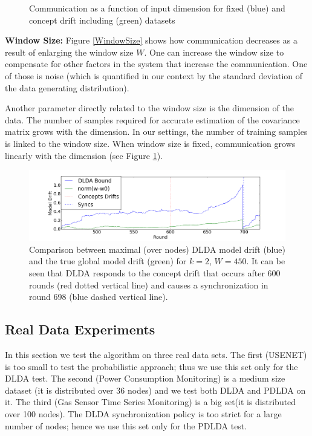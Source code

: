 \begin{figure}[!htb]
  \caption{Communication as a function of input dimension for fixed (blue) and concept drift including (green) datasets}\label{Dimension}
\endminipage
\end{figure}

\noindent\textbf{Window Size:}
Figure \ref{WindowSize} shows how communication decreases as a result
of enlarging the window size $W$.  One can increase the window size to compensate for other factors in the system that increase the communication. One of those is
noise (which is quantified in our context by the standard deviation of the
data generating distribution).


Another parameter directly related to the window size is the dimension of the data. The number of samples required for accurate estimation of the covariance matrix grows with the dimension. In our settings, the number of training samples is linked to the window size. When window size is fixed, communication grows linearly with the dimension (see Figure \ref{Dimension}).



\begin{figure}
	\centering
	\includegraphics[width=\textwidth]{Usenet/DriftDetected.png}
	\caption{Comparison between maximal (over nodes) DLDA model drift (blue)
	and the true global model drift (green) for $k=2$, $W=450$.
	It can be seen that DLDA responds to the concept drift that occurs
	after 600 rounds (red dotted vertical line) and causes a synchronization in round 698 (blue dashed vertical line).}
	\label{usenet}
	\end{figure}
\subsection{Real Data Experiments}
In this section we test the algorithm on three real data sets. The first
(USENET) is too small to test the probabilistic approach; thus we use this set only for the DLDA test.
The second (Power Consumption Monitoring) is a medium size dataset (it
is distributed over 36 nodes) and we test both DLDA and PDLDA on it.
The third (Gas Sensor Time Series Monitoring) is a big set(it is distributed over
100 nodes). The DLDA synchronization policy is too strict for a large number of nodes; hence we use this set only for the PDLDA test.

